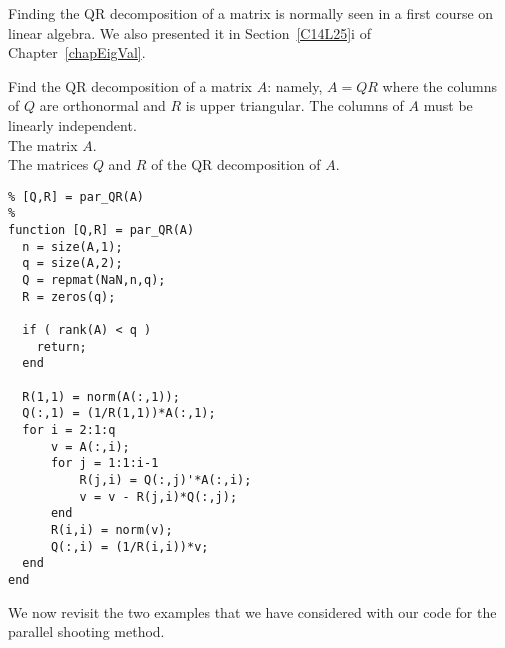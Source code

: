 Finding the QR decomposition of a matrix is normally seen in a first
course on linear algebra.  We also presented it in
Section~\ref{C14L25}i of Chapter~\ref{chapEigVal}.

\begin{code}[QR Decomposition]
Find the QR decomposition of a matrix $A$: namely, $A=QR$ where the
columns of $Q$ are orthonormal and $R$ is upper triangular.   The
columns of $A$ must be linearly independent.\\
 The  matrix $A$.\\
 The matrices $Q$ and $R$ of the QR decomposition of $A$.
\small
\begin{verbatim}
% [Q,R] = par_QR(A)
%
function [Q,R] = par_QR(A)
  n = size(A,1);
  q = size(A,2);
  Q = repmat(NaN,n,q);
  R = zeros(q);

  if ( rank(A) < q )
    return;
  end

  R(1,1) = norm(A(:,1));
  Q(:,1) = (1/R(1,1))*A(:,1);
  for i = 2:1:q
      v = A(:,i);
      for j = 1:1:i-1
          R(j,i) = Q(:,j)'*A(:,i);
          v = v - R(j,i)*Q(:,j); 
      end
      R(i,i) = norm(v);
      Q(:,i) = (1/R(i,i))*v;
  end
end
\end{verbatim}
\end{code}

We now revisit the two examples that we have considered with our code
for the parallel shooting method.

